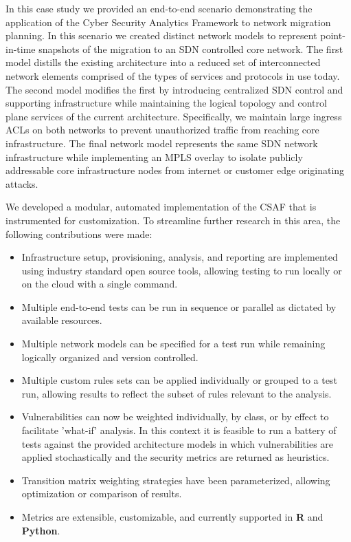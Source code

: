 In this case study we provided an end-to-end scenario demonstrating the application of the Cyber Security Analytics Framework to network migration planning. In this scenario we created distinct network models to represent point-in-time snapshots of the migration to an SDN controlled core network. The first model distills the existing architecture into a reduced set of interconnected network elements comprised of the types of services and protocols in use today. The second model modifies the first by introducing centralized SDN control and supporting infrastructure while maintaining the logical topology and control plane services of the current architecture. Specifically, we maintain large ingress ACLs on both networks to prevent unauthorized traffic from reaching core infrastructure. The final network model represents the same SDN network infrastructure while implementing an MPLS overlay to isolate publicly addressable core infrastructure nodes from internet or customer edge originating attacks.  

We developed a modular, automated implementation of the CSAF that is instrumented for customization. To streamline further research in this area, the following contributions were made:
\begin{itemize}
\item Infrastructure setup, provisioning, analysis, and reporting are implemented using industry standard open source tools, allowing testing to run locally or on the cloud with a single command. 
\end{itemize}
\begin{itemize}
\item Multiple end-to-end tests can be run in sequence or parallel as dictated by available resources.
\item Multiple network models can be specified for a test run while remaining logically organized and version controlled. 
\item Multiple custom rules sets can be applied individually or grouped to a test run, allowing results to reflect the subset of rules relevant to the analysis.
\item Vulnerabilities can now be weighted individually, by class, or by effect to facilitate 'what-if' analysis. In this context it is feasible to run a battery of tests against the provided architecture models in which vulnerabilities are applied stochastically and the security metrics are returned as heuristics.
\item  Transition matrix weighting strategies have been parameterized, allowing optimization or comparison of results. 
\item Metrics are extensible, customizable, and currently supported in \textbf{R} and \textbf{Python}. 
\end{itemize}

